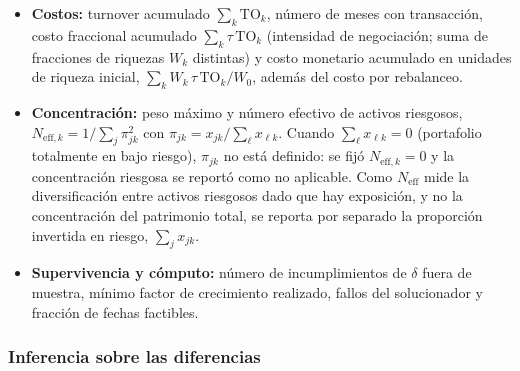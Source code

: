 \begin{itemize}
    \item \textbf{Costos:} 
turnover acumulado $\sum_k\mathrm{TO}_k$, número de meses con transacción, costo fraccional acumulado $\sum_k\tau\,\mathrm{TO}_k$ (intensidad de negociación; suma de fracciones de riquezas $W_k$ distintas) y costo monetario acumulado en unidades de riqueza inicial, $\sum_k W_k\,\tau\,\mathrm{TO}_k/W_0$, además del costo por rebalanceo.

    \item \textbf{Concentración:} 
peso máximo y número efectivo de activos riesgosos, $N_{\mathrm{eff},k}=1/\sum_{j}\pi_{jk}^2$ con $\pi_{jk}=x_{jk}/\sum_{\ell}x_{\ell k}$. Cuando $\sum_\ell x_{\ell k}=0$ (portafolio totalmente en bajo riesgo), $\pi_{jk}$ no está definido: se fijó $N_{\mathrm{eff},k}=0$ y la concentración riesgosa se reportó como no aplicable. Como $N_{\mathrm{eff}}$ mide la diversificación entre activos riesgosos dado que hay exposición, y no la concentración del patrimonio total, se reporta por separado la proporción invertida en riesgo, $\sum_j x_{jk}$.

    \item \textbf{Supervivencia y cómputo:} número de incumplimientos de $\delta$ fuera de muestra, mínimo factor de crecimiento realizado, fallos del solucionador y fracción de fechas factibles.
\end{itemize}

\subsubsection{Inferencia sobre las diferencias}

